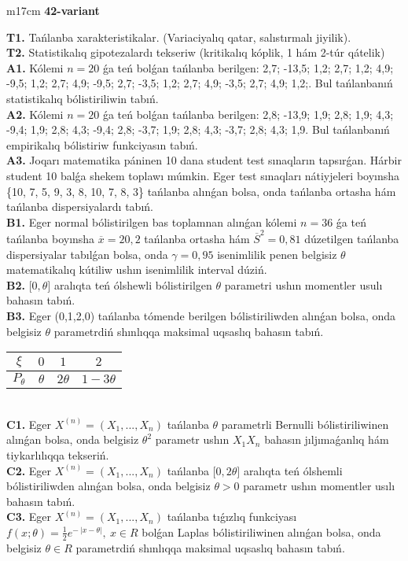 \documentclass{article}
\begin{document}
\begin{tabular}{m{17cm}}
\textbf{42-variant}
\newline

\textbf{T1.} 
Tańlanba xarakteristikalar. (Variaciyalıq qatar, salıstırmalı jiyilik).
 \\
\textbf{T2.} 
Statistikalıq gipotezalardı tekseriw (kritikalıq kóplik, 1 hám 2-túr qátelik)
 \\
\textbf{A1.} 
Kólemi \(n = 20\) ǵa teń bolǵan tańlanba berilgen: 2,7; -13,5; 1,2; 2,7; 1,2; 4,9; -9,5; 1,2; 2,7; 4,9; -9,5; 2,7; -3,5; 1,2; 2,7; 4,9; -3,5; 2,7; 4,9; 1,2;. Bul tańlanbanıń statistikalıq bólistiriliwin tabıń.
 \\
\textbf{A2.} 
Kólemi \(n = 20\) ǵa teń bolǵan tańlanba berilgen: 2,8; -13,9; 1,9; 2,8; 1,9; 4,3; -9,4; 1,9; 2,8; 4,3; -9,4; 2,8; -3,7; 1,9; 2,8; 4,3; -3,7; 2,8; 4,3; 1,9. Bul tańlanbanıń empirikalıq bólistiriw funkciyasın tabıń.
 \\
\textbf{A3.} 
Joqarı matematika páninen 10 dana student test sınaqların tapsırǵan. Hárbir student 10 balǵa shekem toplawı múmkin. Eger test sınaqları nátiyjeleri boyınsha \{10, 7, 5, 9, 3, 8, 10, 7, 8, 3\} tańlanba alınǵan bolsa, onda tańlanba ortasha hám tańlanba dispersiyalardı tabıń.
 \\
\textbf{B1.} 
Eger normal bólistirilgen bas toplamnan alınǵan kólemi \(n = 36\) ǵa teń tańlanba boyınsha \(\overline{x} = 20,2\) tańlanba ortasha hám \({\overline{S}}^{2} = 0,81\) dúzetilgen tańlanba dispersiyalar tabılǵan bolsa, onda \(\gamma = 0,95\) isenimlilik penen belgisiz \(\theta\) matematikalıq kútiliw ushın isenimlilik interval dúziń.
 \\
\textbf{B2.} 
\(\lbrack 0,\theta\rbrack\) aralıqta teń ólshewli bólistirilgen \(\theta\) parametri ushın momentler usulı bahasın tabıń.
 \\
\textbf{B3.} 
Eger (0,1,2,0) tańlanba tómende berilgen bólistiriliwden alınǵan bolsa, onda belgisiz \(\theta\) parametrdiń shınlıqqa maksimal uqsaslıq bahasın tabıń.
\begin{tabular}{|c|c|c|c|}
  \hline
$\xi$
&
$0$
&
$1$
&
$2$\\
\hline
\(P_{\theta}\) & \(\theta\) & \(2\theta\) & \(1 - 3\theta\) \\
\hline
\end{tabular}
 \\
\textbf{C1.} 
Eger \(X^{(n)} = \left( X_{1},...,X_{n} \right)\) tańlanba \(\theta\) parametrli Bernulli bólistiriliwinen alınǵan bolsa, onda belgisiz \(\theta^{2}\) parametr ushın \(X_{1}X_{n}\) bahasın jıljımaǵanlıq hám tiykarlılıqqa tekseriń.
 \\
\textbf{C2.} 
Eger \(X^{(n)} = \left( X_{1},...,X_{n} \right)\) tańlanba {[}\(0,2\theta\rbrack\) aralıqta teń ólshemli bólistiriliwden alınǵan bolsa, onda belgisiz \(\theta > 0\) parametr ushın momentler usılı bahasın tabıń.
 \\
\textbf{C3.} 
Eger \(X^{(n)} = \left( X_{1},...,X_{n} \right)\) tańlanba tıǵızlıq funkciyası
$f(x;\theta) = \frac{1}{2}e^{- \ |x - \theta|},\ x \in R$
bolǵan Laplas bólistiriliwinen alınǵan bolsa, onda belgisiz \(\theta \in R\) parametrdiń shınlıqqa maksimal uqsaslıq bahasın tabıń.
 \\

\end{tabular}
\end{document}
